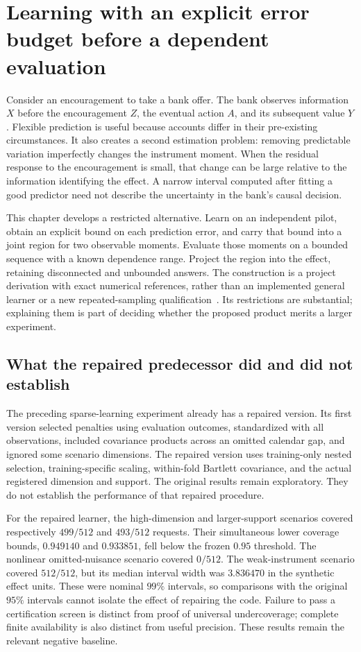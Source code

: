 \chapter{Learning with an explicit error budget before a dependent evaluation}
\label{exec13:dependent-pilot}

Consider an encouragement to take a bank offer. The bank observes information
$X$ before the encouragement $Z$, the eventual action $A$, and its subsequent
value $Y$. Flexible prediction is useful because accounts differ in their
pre-existing circumstances. It also creates a second estimation problem:
removing predictable variation imperfectly changes the instrument moment.
When the residual response to the encouragement is small, that change can be
large relative to the information identifying the effect. A narrow interval
computed after fitting a good predictor need not describe the uncertainty in
the bank's causal decision.

This chapter develops a restricted alternative. Learn on an independent pilot,
obtain an explicit bound on each prediction error, and carry that bound into
a joint region for two observable moments. Evaluate those moments on a bounded
sequence with a known dependence range. Project the region into the effect,
retaining disconnected and unbounded answers. The construction is a project
derivation with exact numerical references, rather than an implemented general
learner or a new repeated-sampling qualification~\citep{exec13_dependent_argument}.
Its restrictions are substantial; explaining them is part of deciding whether
the proposed product merits a larger experiment.

\section{What the repaired predecessor did and did not establish}

The preceding sparse-learning experiment already has a repaired version. Its
first version selected penalties using evaluation outcomes, standardized with
all observations, included covariance products across an omitted calendar gap,
and ignored some scenario dimensions. The repaired version uses training-only
nested selection, training-specific scaling, within-fold Bartlett covariance,
and the actual registered dimension and support. The original results remain
exploratory. They do not establish the performance of that repaired procedure.

For the repaired learner, the high-dimension and larger-support scenarios
covered respectively $499/512$ and $493/512$ requests. Their simultaneous lower
coverage bounds, $0.949140$ and $0.933851$, fell below the frozen $0.95$ threshold.
The nonlinear omitted-nuisance scenario covered $0/512$. The weak-instrument
scenario covered $512/512$, but its median interval width was $3.836470$ in the
synthetic effect units. These were nominal $99\%$ intervals, so comparisons
with the original $95\%$ intervals cannot isolate the effect of repairing the
code. Failure to pass a certification screen is distinct from proof of universal
undercoverage; complete finite availability is also distinct from useful
precision. These results remain the relevant negative baseline.

